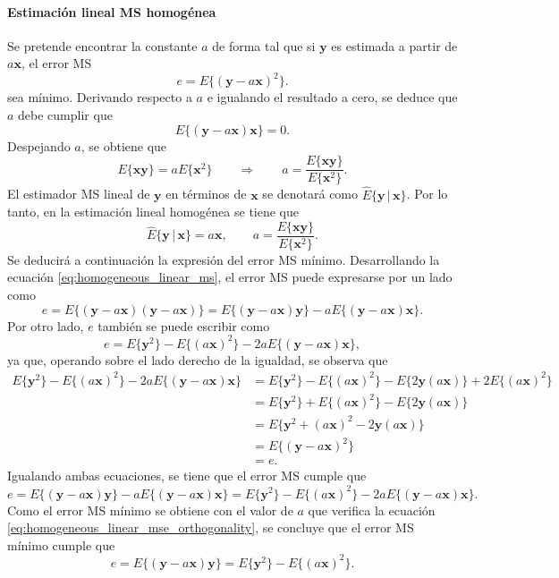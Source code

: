 \documentclass[a4paper]{report}
\newcommand{\x}{\mathbf{x}}
\newcommand{\y}{\mathbf{y}}
\begin{document}
\paragraph{Estimación lineal MS homogénea} Se pretende encontrar la constante \(a\) de forma tal que si \(\y\) es estimada a partir de \(a\x\), el error MS
\begin{equation}\label{eq:homogeneous_linear_ms}
 e=E\{(\y-a\x)^2\}.
\end{equation}
sea mínimo. Derivando respecto a \(a\) e igualando el resultado a cero, se deduce que \(a\) debe cumplir que
\begin{equation}\label{eq:homogeneous_linear_mse_orthogonality}
 E\{(\y-a\x)\x\}=0.
\end{equation}
Despejando \(a\), se obtiene que
\[
 E\{\x\y\}=aE\{\x^2\}\qquad\Rightarrow\qquad a=\frac{E\{\x\y\}}{E\{\x^2\}}.
\]
El estimador MS lineal de \(\y\) en términos de \(\x\) se denotará como \(\hat{E}\{\y\,|\,\x\}\). Por lo tanto, en la estimación lineal homogénea se tiene que
\[
 \hat{E}\{\y\,|\,\x\}=a\x,\qquad a=\frac{E\{\x\y\}}{E\{\x^2\}}.
\]
Se deducirá a continuación la expresión del error MS mínimo. Desarrollando la ecuación \ref{eq:homogeneous_linear_ms}, el error MS puede expresarse por un lado como
\[
 e=E\{(\y-a\x)(\y-a\x)\}=E\{(\y-a\x)\y\}-aE\{(\y-a\x)\x\}.
\]
Por otro lado, \(e\) también se puede escribir como
\[
 e=E\{\y^2\}-E\{(a\x)^2\}-2aE\{(\y-a\x)\x\},
\]
ya que, operando sobre el lado derecho de la igualdad, se observa que
\begin{align*}
  E\{\y^2\}-E\{(a\x)^2\}-2aE\{(\y-a\x)\x\}&=E\{\y^2\}-E\{(a\x)^2\}-E\{2\y(a\x)\}+2E\{(a\x)^2\}\\
   &=E\{\y^2\}+E\{(a\x)^2\}-E\{2\y(a\x)\}\\
   &=E\{\y^2+(a\x)^2-2\y(a\x)\}\\
   &=E\{(\y-a\x)^2\}\\
   &=e.
\end{align*}
Igualando ambas ecuaciones, se tiene que el error MS cumple que
\[
 e=E\{(\y-a\x)\y\}-aE\{(\y-a\x)\x\}=E\{\y^2\}-E\{(a\x)^2\}-2aE\{(\y-a\x)\x\}.
\]
Como el error MS mínimo se obtiene con el valor de \(a\) que verifica la ecuación \ref{eq:homogeneous_linear_mse_orthogonality}, se concluye que el error MS mínimo cumple que
\begin{equation}\label{eq:homogeneous_linear_mse_pythagoras}
  e=E\{(\y-a\x)\y\}=E\{\y^2\}-E\{(a\x)^2\}.
\end{equation}
\end{document}
